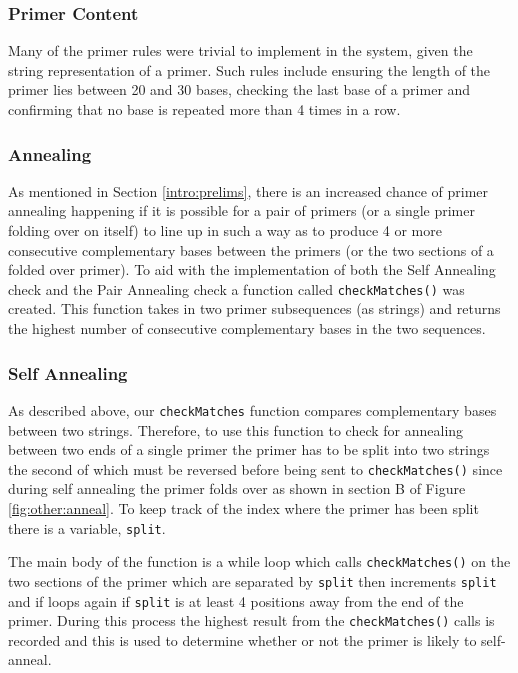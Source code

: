 \subsubsection{Primer Content}
Many of the primer rules were trivial to implement in the system, given
the string representation of a primer. Such rules include ensuring the
length of the primer lies between 20 and 30 bases, checking the last base
of a primer and confirming that no base is repeated more than 4 times
in a row. 

\subsubsection{Annealing}

As mentioned in Section \ref{intro:prelims}, there is an increased
chance of primer annealing happening if it is possible for a pair of
primers (or a single primer folding over on itself) to line up in such a
way as to produce 4 or more consecutive complementary bases between the
primers (or the two sections of a folded over primer). To aid with the
implementation of both the Self Annealing check and the Pair Annealing
check a function called \texttt{checkMatches()} was created. This function
takes in two primer subsequences (as strings) and returns the highest 
number of consecutive complementary bases in the two sequences.

\subsubsection{Self Annealing}

As described above, our \texttt{checkMatches} function compares
complementary bases between two strings. Therefore, to use this function
to check for annealing between two ends of a single primer the primer
has to be split into two strings the second of which must be reversed
before being sent to \texttt{checkMatches()} since during self annealing
the primer folds over as shown in section B of Figure 
\ref{fig:other:anneal}. To keep track of the index where the primer has
been split there is a variable, \texttt{split}.

The main body of the function is a while loop which calls
\texttt{checkMatches()} on the two sections of the primer which are
separated by \texttt{split} then increments \texttt{split} and if loops
again if \texttt{split} is at least 4 positions away from the end of the
primer. During this process the highest result from the
\texttt{checkMatches()} calls is recorded and this is used to determine
whether or not the primer is likely to self-anneal.

